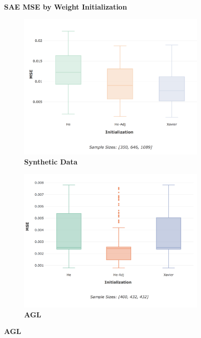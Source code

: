 \documentclass[a4paper,11pt,oneside]{article}
\theoremstyle{plain}
\theoremstyle{definition}
\begin{document}
	\begin{figure}[H]
		\centering
		\textbf{SAE MSE by Weight Initialization}
		\begin{subfigure}{.5\textwidth}
			\centering 
			\includegraphics[scale=0.28]{images/results/newinit/synthetic_mse_init.png}
			\caption{\textbf{Synthetic Data} 
				\newline }
			\label{figure-synthetic_mse_init}
		\end{subfigure}%
		\begin{subfigure}{.5\textwidth}
			\centering 
			\includegraphics[scale=0.28]{images/results/newinit/agl_mse_init.png}
			\caption{\textbf{AGL} 
				\newline }

\end{subfigure}
\end{figure}
\end{document}
